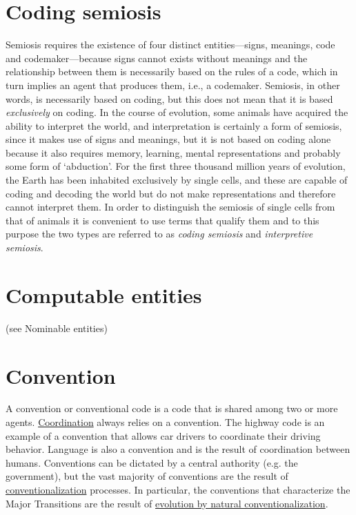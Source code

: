 \documentclass[12pt]{article}
\begin{document}
\section{Coding semiosis }
Semiosis requires the existence of four distinct entities---signs, meanings, code and codemaker---because signs cannot exists without meanings and the relationship between them is necessarily based on the rules of a code, which in turn implies an agent that produces them, i.e., a codemaker. Semiosis, in other words, is necessarily based on coding, but this does not mean that it is based \textit{exclusively} on coding. In the course of evolution, some animals have acquired the ability to interpret the world, and interpretation is certainly a form of semiosis, since it makes use of signs and meanings, but it is not based on coding alone because it also requires memory, learning, mental representations and probably some form of `abduction'. For the first three thousand million years of evolution, the Earth has been inhabited exclusively by single cells, and these are capable of coding and decoding the world but do not make representations and therefore cannot interpret them. In order to distinguish the semiosis of single cells from that of animals it is convenient to use terms that qualify them and to this purpose the two types are referred to as \textit{coding semiosis} and \textit{interpretive semiosis}.


\section{Computable entities} (see Nominable entities)

\hypertarget{convention}{}
\section{Convention}

A convention or conventional code is a code that is shared among two
or more agents. \hyperlink{coordination}{Coordination} always relies
on a convention. The highway code is an example of a convention that
allows car drivers to coordinate their driving behavior. Language is
also a convention and is the result of coordination between
humans. Conventions can be dictated by a central authority (e.g. the
government), but the vast majority of conventions are the result of
\hyperlink{conventionalization}{conventionalization} processes. In
particular, the conventions that characterize the Major Transitions
are the result of \hyperlink{natural_conventionalization}{evolution by
  natural conventionalization}.
\end{document}
